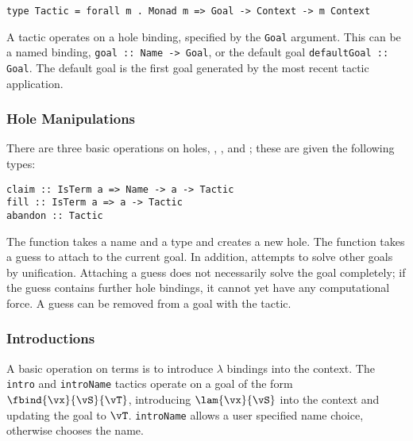 \begin{verbatim}
type Tactic = forall m . Monad m => Goal -> Context -> m Context
\end{verbatim}

A tactic operates on a hole binding, specified by the \texttt{Goal}
argument. This can be a named binding, \texttt{goal :: Name -> Goal},
or the default goal \texttt{defaultGoal :: Goal}. The default goal is
the first goal generated by the most recent tactic application.

\subsubsection{Hole Manipulations}
There are three basic operations on holes, , ,
and ; these are given the following types:

\begin{verbatim}
claim :: IsTerm a => Name -> a -> Tactic
fill :: IsTerm a => a -> Tactic
abandon :: Tactic
\end{verbatim}

The  function takes a name and a type and creates a new
hole. The  function takes a guess to attach to the current
goal. In addition,  attempts to solve other goals by
unification. Attaching a guess does not necessarily solve the goal
completely; if the guess contains further hole bindings, it cannot yet
have any computational force. 
A guess can be removed from a goal with the 
tactic.


\subsubsection{Introductions}
A basic operation on terms is to introduce $\lambda$ bindings into the
context. The \texttt{intro} and \texttt{introName} tactics operate on
a goal of the form $\fbind{\vx}{\vS}{\vT}$, introducing
$\lam{\vx}{\vS}$ into the context and updating the goal to
$\vT$. \texttt{introName} allows a user specified name choice,
otherwise \Ivor{} chooses the name.

